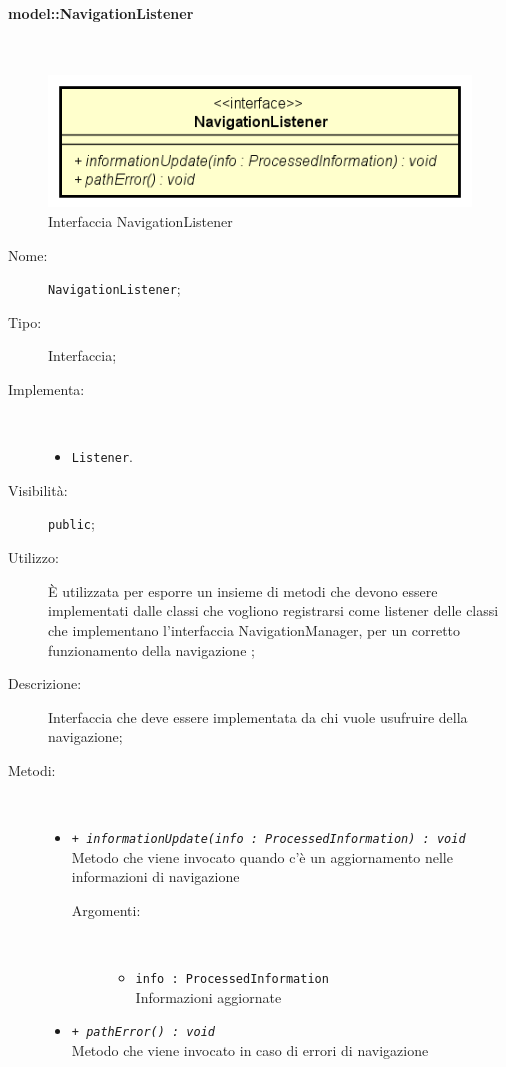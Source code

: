 \documentclass[../DefinizioneDiProdotto.tex]{subfiles}
\begin{document}
\paragraph{model::NavigationListener}
\
\begin{figure}[H]
	\centering
	\includegraphics[width=\maxwidth]{img/NavigationListener.png}
	\caption{Interfaccia NavigationListener}\label{fig:model::NavigationListener} 
\end{figure}
\begin{description}
	\item[Nome:] \texttt{NavigationListener};
	\item[Tipo:] Interfaccia;
	\item[Implementa:] \
	\begin{itemize}
		\item \texttt{Listener}.
		
	\end{itemize}
	\item[Visibilità:] \texttt{public};
	\item[Utilizzo:] È utilizzata per esporre un insieme di metodi che devono essere implementati dalle classi che vogliono registrarsi come listener delle classi che implementano l'interfaccia NavigationManager, per un corretto funzionamento della navigazione ;
	\item[Descrizione:] Interfaccia che deve essere implementata da chi vuole usufruire della navigazione;
	\item[Metodi:] \
	\begin{itemize}
		\item \texttt{+ \textit{informationUpdate(info : ProcessedInformation) : void}}\\
		Metodo che viene invocato quando c'è un aggiornamento nelle informazioni di navigazione
		\begin{description}
			\item[Argomenti:] \
			\begin{itemize}
				\item \texttt{info : ProcessedInformation}\\
				Informazioni aggiornate\end{itemize}
		\end{description}
		\item \texttt{+ \textit{pathError() : void}}\\
		Metodo che viene invocato in caso di errori di navigazione
	\end{itemize}
\end{description}
\end{document}
